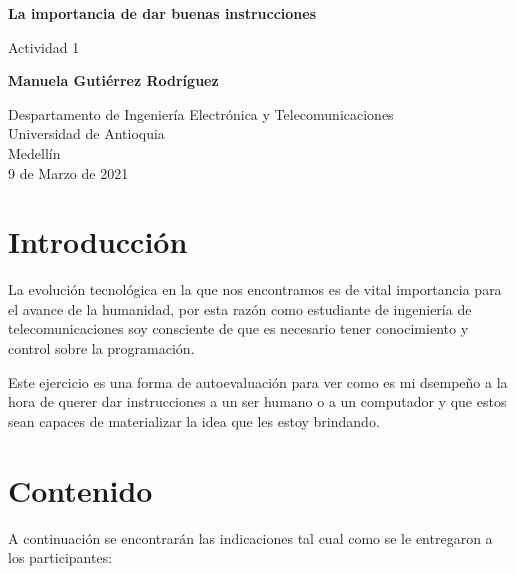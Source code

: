 \documentclass{article}
\begin{document}
\begin{titlepage}
    \begin{center}
        \vspace*{1cm}
            
        \Huge
        \textbf{La importancia de dar buenas instrucciones}
            
        \vspace{0.5cm}
        \LARGE
        Actividad 1
            
        \vspace{1.5cm}
            
        \textbf{Manuela Gutiérrez Rodríguez}
            
        \vfill
            
        \vspace{0.8cm}
            
        \Large
        Despartamento de Ingeniería Electrónica y Telecomunicaciones\\
        Universidad de Antioquia\\
        Medellín\\
        9 de Marzo de 2021
            
    \end{center}
\end{titlepage}

\tableofcontents
\newpage
\section{Introducción}\label{intro}
La evolución tecnológica en la que nos encontramos es de vital importancia para el avance de la humanidad, por esta razón como estudiante de ingeniería de telecomunicaciones soy consciente de que es necesario tener conocimiento y control sobre la programación.

\vspace{5mm}

Este ejercicio es una forma de autoevaluación para ver como es mi dsempeño a la hora de querer dar instrucciones a un ser humano o a un computador y que estos sean capaces de materializar la idea que les estoy brindando.

\section{Contenido} \label{contenido}

A continuación se encontrarán las indicaciones tal cual como se le entregaron a los participantes:
\end{document}
